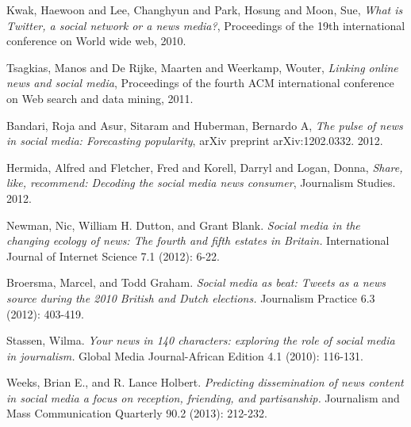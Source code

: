 \documentclass{proc}
\begin{document}
 
\begin{thebibliography}{99}

 Kwak, Haewoon and Lee, Changhyun and Park, Hosung and Moon, Sue, 
\emph{What is Twitter, a social network or a news media?}, Proceedings of the 19th international conference on World wide web,
2010.

 Tsagkias, Manos and De Rijke, Maarten and Weerkamp, Wouter, 
\emph{Linking online news and social media}, Proceedings of the fourth ACM international conference on Web search and data mining,
2011.

 Bandari, Roja and Asur, Sitaram and Huberman, Bernardo A, 
\emph{The pulse of news in social media: Forecasting popularity}, arXiv preprint arXiv:1202.0332.
2012.

 Hermida, Alfred and Fletcher, Fred and Korell, Darryl and Logan, Donna, 
\emph{Share, like, recommend: Decoding the social media news consumer}, Journalism Studies. 2012.

 Newman, Nic, William H. Dutton, and Grant Blank. 
\emph{Social media in the changing ecology of news: The fourth and fifth estates in Britain.}
International Journal of Internet Science 7.1 (2012): 6-22.

 Broersma, Marcel, and Todd Graham. 
\emph{Social media as beat: Tweets as a news source during the 2010 British and Dutch elections.}
Journalism Practice 6.3 (2012): 403-419.

 Stassen, Wilma. 
\emph{Your news in 140 characters: exploring the role of social media in journalism.}
Global Media Journal-African Edition 4.1 (2010): 116-131.


 Weeks, Brian E., and R. Lance Holbert. 
\emph{Predicting dissemination of news content in social media a focus on reception, friending, and partisanship.}
Journalism and Mass Communication Quarterly 90.2 (2013): 212-232.

\end{thebibliography}
\end{document}
